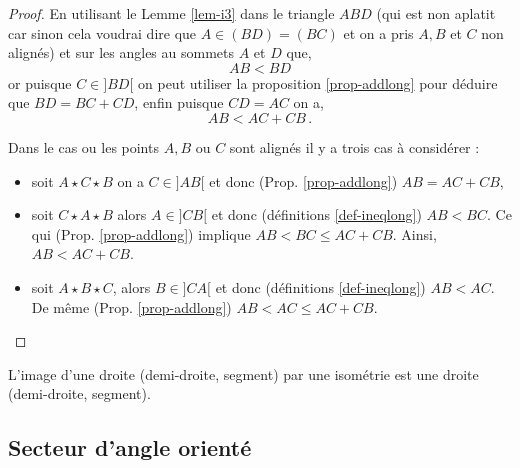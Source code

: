 \begin{thm}
\begin{proof}
En utilisant le Lemme \ref{lem-i3} dans le triangle $ABD$ (qui est non aplatit car sinon cela voudrai dire que $A\in (BD)=(BC)$ et on a pris $A,B$ et $C$ non alignés) et sur les angles au sommets $A$ et $D$ que,
\begin{equation*}
AB<BD
\end{equation*}
or puisque $C\in ]BD[$ on peut utiliser la proposition \ref{prop-addlong} pour déduire que $BD=BC+CD$, enfin puisque $CD=AC$ on a,
\begin{equation*}
AB < AC + CB\,.
\end{equation*}

Dans le cas ou les points $A,B$ ou $C$ sont alignés il y a trois cas à considérer : 
\begin{itemize}[$\bullet$]
\item soit $A\star C \star B$ on  a $C \in ]AB[$ et donc (Prop. \ref{prop-addlong}) $AB = AC + CB$,
\item soit $C\star A \star B$ alors $A\in ]CB[$ et donc (définitions \ref{def-ineqlong}) $AB < BC$.  Ce qui (Prop. \ref{prop-addlong}) implique $AB < BC \leq AC + CB $. Ainsi, $ AB < AC + CB$.
\item soit  $A\star B \star C$, alors $B\in ]CA[$ et donc (définitions \ref{def-ineqlong}) $AB < AC$. De même (Prop. \ref{prop-addlong}) $AB < AC \leq AC + CB$. 
\end{itemize}
\end{proof}
\end{thm}

\begin{cor}
    L'image d'une droite (demi-droite, segment) par une isométrie est une droite (demi-droite, segment). 
\end{cor}

        \subsection{Secteur d'angle orienté}

